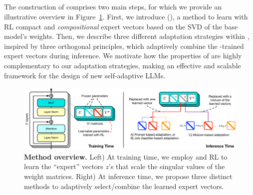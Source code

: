 \subsection{\textsc{\implname}}
\label{sec:transformer^2}

The construction of \implname comprises two main steps, for which we provide an illustrative overview in Figure~\ref{fig:method_overview}.
First, we introduce \svdname (\svdacro), a method to learn with RL compact and \textit{compositional} expert vectors based on the SVD of the base model's weights.
Then, we describe three different adaptation strategies within \implname, inspired by three orthogonal principles, which adaptively combine the \svdacro-trained expert vectors during inference.
We motivate how the properties of \svdacro are highly complementary to our adaptation strategies, making \implname an effective and scalable framework for the design of new self-adaptive LLMs.

\begin{figure}[!h]
    \centering
    \includegraphics[width=\textwidth]{images/method_overview.pdf}
    \caption{\textbf{Method overview.}
    Left) At training time, we employ \svdacro and RL to learn the ``expert'' vectors $z$'s that scale the singular values of the weight matrices.
    Right) At inference time, we propose three distinct methods to adaptively select/combine the learned expert vectors.
    }
    \label{fig:method_overview}
\end{figure}


